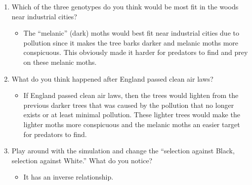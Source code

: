 \documentclass{article}
\begin{document}
\begin{enumerate}
\begin{itemize}
  \end{itemize}
  \item Which of the three genotypes do you think would be most fit in the woods near industrial cities?
  \begin{itemize}
    \item The ``melanic'' (dark) moths would best fit near industrial cities due to pollution since it makes the tree barks darker and melanic moths more conspicuous. This obviously made it harder for predators to find and prey on these melanic moths.
  \end{itemize}
  \item What do you think happened after England passed clean air laws?
  \begin{itemize}
    \item If England passed clean air laws, then the trees would lighten from the previous darker trees that was caused by the pollution that no longer exists or at least minimal pollution. These lighter trees would make the lighter moths more conspicuous and the melanic moths an easier target for predators to find.
  \end{itemize}
  \item Play around with the simulation and change the ``selection against Black, selection against White.'' What do you notice?
  \begin{itemize}
    \item It has an inverse relationship.
  \end{itemize}
\end{enumerate}
\end{document}
